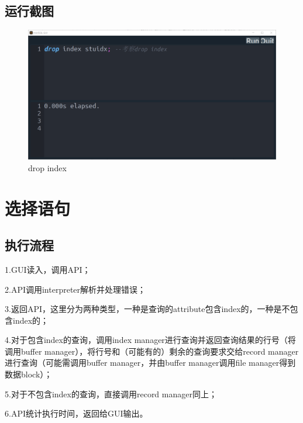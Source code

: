 \documentclass[UTF8]{ctexrep} %
\begin{document}
\subsection{运行截图}
\begin{figure}[H]
    \centering
    \includegraphics[width=0.8\linewidth]{figure/4.1.png}
    \caption{drop index}
    \label{fig:runtime4.1}
\end{figure}
\section{选择语句}
\subsection{执行流程}
1.GUI读入，调用API；
\par
2.API调用interpreter解析并处理错误；
\par
3.返回API，这里分为两种类型，一种是查询的attribute包含index的，一种是不包含index的；
\par
4.对于包含index的查询，调用index manager进行查询并返回查询结果的行号（将调用buffer manager），将行号和（可能有的）剩余的查询要求交给record manager进行查询（可能需调用buffer manager，并由buffer manager调用file manager得到数据block）；
\par
5.对于不包含index的查询，直接调用record manager同上；
\par
6.API统计执行时间，返回给GUI输出。
\end{document}
